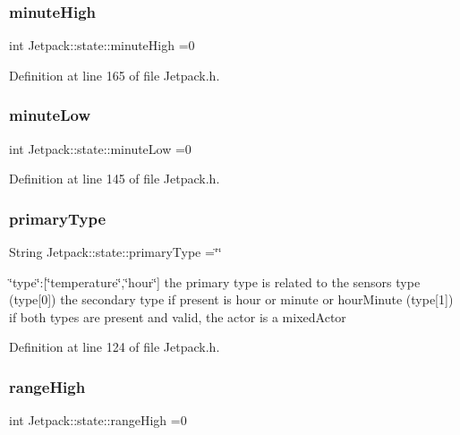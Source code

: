 \subsubsection{\texorpdfstring{minute\+High}{minuteHigh}}
{\footnotesize\ttfamily int Jetpack\+::state\+::minute\+High =0}



Definition at line 165 of file Jetpack.\+h.

\mbox{\label{struct_jetpack_1_1state_aa699e25d802a00e86d3a8032ec48b88b}} 
\subsubsection{\texorpdfstring{minute\+Low}{minuteLow}}
{\footnotesize\ttfamily int Jetpack\+::state\+::minute\+Low =0}



Definition at line 145 of file Jetpack.\+h.

\mbox{\label{struct_jetpack_1_1state_aa6242c32eb0ab42aaea170636ab949e1}} 
\subsubsection{\texorpdfstring{primary\+Type}{primaryType}}
{\footnotesize\ttfamily String Jetpack\+::state\+::primary\+Type =\char`\"{}\char`\"{}}

\char`\"{}type\char`\"{}\+:\mbox{[}\char`\"{}temperature\char`\"{},\char`\"{}hour\char`\"{}\mbox{]} the primary type is related to the sensor\textquotesingle{}s type (type\mbox{[}0\mbox{]}) the secondary type if present is hour or minute or hour\+Minute (type\mbox{[}1\mbox{]}) if both types are present and valid, the actor is a mixed\+Actor 

Definition at line 124 of file Jetpack.\+h.

\mbox{\label{struct_jetpack_1_1state_ae330612c3da637654ecfa89d36620b93}} 
\subsubsection{\texorpdfstring{range\+High}{rangeHigh}}
{\footnotesize\ttfamily int Jetpack\+::state\+::range\+High =0}

